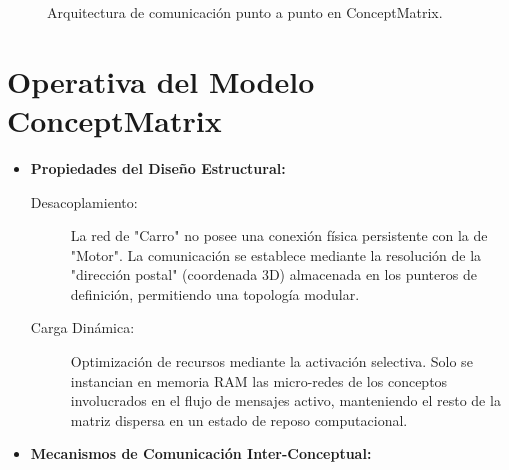 \documentclass[12pt]{article}
\begin{document}
\begin{figure}[h]
	\caption{Arquitectura de comunicación punto a punto en ConceptMatrix.}
\end{figure}


\section{Operativa del Modelo ConceptMatrix}

\begin{itemize}
    \item \textbf{Propiedades del Diseño Estructural:}
    \begin{description}
        \item[Desacoplamiento:] La red de "Carro" no posee una conexión física persistente con la de "Motor". La comunicación se establece mediante la resolución de la "dirección postal" (coordenada 3D) almacenada en los punteros de definición, permitiendo una topología modular.
        \item[Carga Dinámica:] Optimización de recursos mediante la activación selectiva. Solo se instancian en memoria RAM las micro-redes de los conceptos involucrados en el flujo de mensajes activo, manteniendo el resto de la matriz dispersa en un estado de reposo computacional.
    \end{description}

    \item \textbf{Mecanismos de Comunicación Inter-Conceptual:}
\end{itemize}
\end{document}
